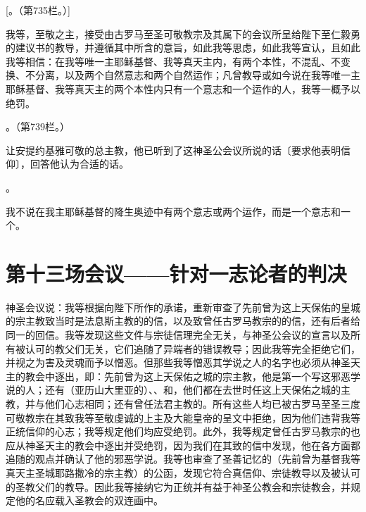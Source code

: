[。（第735栏。）]\par

我等，至敬之主，接受由古罗马至圣可敬教宗及其属下的会议所呈给陛下至仁毅勇的建议书的教导，并遵循其中所含的意旨，如此我等思虑，如此我等宣认，且如此我等相信：在我等唯一主耶稣基督、我等真天主内，有两个本性，不混乱、不变换、不分离，以及两个自然意志和两个自然运作；凡曾教导或如今说在我等唯一主耶稣基督、我等真天主的两个本性内只有一个意志和一个运作的人，我等一概予以绝罚。\par

。（第739栏。）\par

让安提约基雅可敬的总主教，他已听到了这神圣公会议所说的话〔要求他表明信仰〕，回答他认为合适的话。\par

。\par

我不说在我主耶稣基督的降生奥迹中有两个意志或两个运作，而是一个意志和一个。\par


\section{第十三场会议——针对一志论者的判决}

神圣会议说：我等根据向陛下所作的承诺，重新审查了先前曾为这上天保佑的皇城的宗主教致当时是法息斯主教的的信，以及致曾任古罗马教宗的的信，还有后者给同一的回信。我等发现这些文件与宗徒信理完全无关，与神圣公会议的宣言以及所有被认可的教父们无关，它们追随了异端者的错误教导；因此我等完全拒绝它们，并视之为害及灵魂而予以憎恶。但那些我等憎恶其学说之人的名字也必须从神圣天主的教会中逐出，即：先前曾为这上天保佑之城的宗主教，他是第一个写这邪恶学说的人；还有（亚历山大里亚的）、、和，他们都在去世时任这上天保佑之城的主教，并与他们心志相同；还有曾任法君主教的。所有这些人均已被古罗马至圣三度可敬教宗在其致我等至敬虔诚的上主及大能皇帝的呈文中拒绝，因为他们违背我等正统信仰的心志；我等规定他们均应受绝罚。此外，我等规定曾任古罗马教宗的也应从神圣天主的教会中逐出并受绝罚，因为我们在其致的信中发现，他在各方面都追随的观点并确认了他的邪恶学说。我等也审查了圣善记忆的（先前曾为基督我等真天主圣城耶路撒冷的宗主教）的公函，发现它符合真信仰、宗徒教导以及被认可的圣教父们的教导。因此我等接纳它为正统并有益于神圣公教会和宗徒教会，并规定他的名应载入圣教会的双连画中。\par

